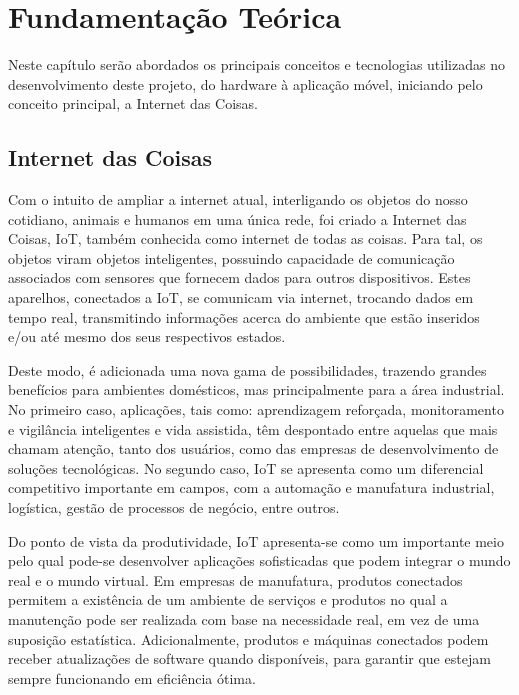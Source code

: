\chapter{Fundamentação Teórica}
\label{cap:fundamentacao}
Neste capítulo serão abordados os principais conceitos e tecnologias utilizadas no desenvolvimento deste projeto, do hardware à aplicação móvel, iniciando pelo conceito principal, a Internet das Coisas.

\section{Internet das Coisas}
\label{fund:iot}
Com o intuito de ampliar a internet atual, interligando os objetos do nosso cotidiano, animais e humanos em uma única rede, foi criado a Internet das Coisas, IoT, também conhecida como internet de todas as coisas. Para tal, os objetos viram objetos inteligentes, possuindo capacidade de comunicação associados com sensores que fornecem dados para outros dispositivos. Estes aparelhos, conectados a IoT, se comunicam via internet, trocando dados em tempo real, transmitindo informações acerca do ambiente que estão inseridos e/ou até mesmo dos seus respectivos estados. 

Deste modo, é adicionada uma nova gama de possibilidades, trazendo grandes benefícios para ambientes domésticos, mas principalmente para a área industrial. No primeiro caso, aplicações, tais como: aprendizagem reforçada, monitoramento e vigilância inteligentes e vida assistida, têm despontado entre aquelas que mais chamam atenção, tanto dos usuários, como das empresas de desenvolvimento de soluções tecnológicas. No segundo caso, IoT se apresenta como um diferencial competitivo importante em campos, com a automação e manufatura industrial, logística, gestão de processos de negócio, entre outros.

Do ponto de vista da produtividade, IoT apresenta-se como um importante meio pelo qual pode-se desenvolver aplicações sofisticadas que podem integrar o mundo real e o mundo virtual. Em empresas de manufatura, produtos conectados permitem a existência de um ambiente de serviços e produtos no qual a manutenção pode ser realizada com base na necessidade real, em vez de uma suposição estatística. Adicionalmente, produtos e máquinas conectados podem receber atualizações de software quando disponíveis, para garantir que estejam sempre funcionando em eficiência ótima.

